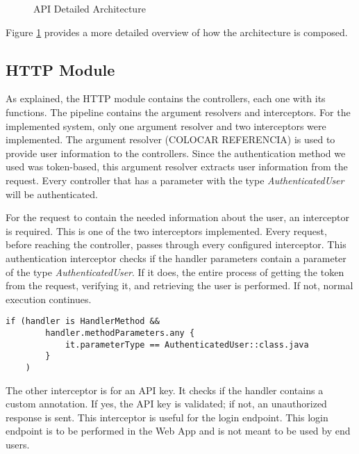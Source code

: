 \vspace{3mm}

\begin{figure}[H]
    \centering
    
    \caption{API Detailed Architecture}
    \label{fig:api_detailed_architecture}
\end{figure}

Figure \ref{fig:api_detailed_architecture} provides a more detailed overview of how the architecture is composed. 

\subsection*{HTTP Module}
As explained, the HTTP module contains the controllers, each one with its functions. The pipeline contains the argument resolvers and interceptors. For the implemented system, only one argument resolver and two interceptors were implemented. The argument resolver (COLOCAR REFERENCIA) is used to provide user information to the controllers. Since the authentication method we used was token-based, this argument resolver extracts user information from the request. Every controller that has a parameter with the type \textit{AuthenticatedUser} will be authenticated. 

For the request to contain the needed information about the user, an interceptor is required. This is one of the two interceptors implemented. Every request, before reaching the controller, passes through every configured interceptor. This authentication interceptor checks if the handler parameters contain a parameter of the type \textit{AuthenticatedUser}. If it does, the entire process of getting the token from the request, verifying it, and retrieving the user is performed. If not, normal execution continues.
\begin{center}
    \begin{lstlisting}[caption={Type AuthenticatedUser verification example}]
    if (handler is HandlerMethod &&
        handler.methodParameters.any {
            it.parameterType == AuthenticatedUser::class.java
        }
    )
    \end{lstlisting}
\end{center}

The other interceptor is for an API key. It checks if the handler contains a custom annotation. If yes, the API key is validated; if not, an unauthorized response is sent. This interceptor is useful for the login endpoint. This login endpoint is to be performed in the Web App and is not meant to be used by end users.

